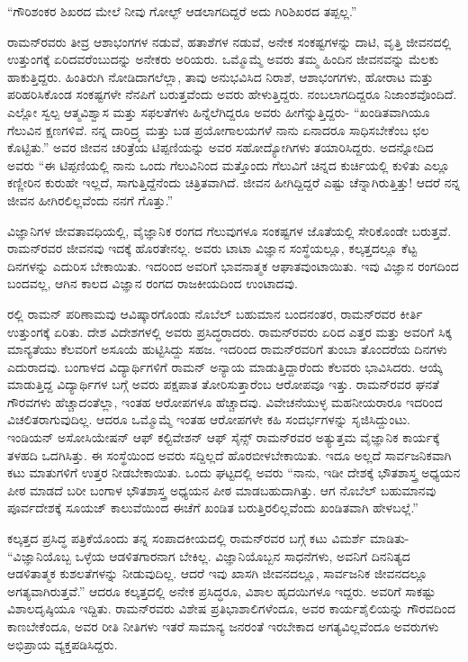“ಗೌರಿಶಂಕರ ಶಿಖರದ ಮೇಲೆ ನೀವು ಗೋಲ್ಫ್ ಆಡಲಾಗದಿದ್ದರೆ ಅದು ಗಿರಿಶಿಖರದ ತಪ್ಪಲ್ಲ.”

ರಾಮನ್‍ರವರು ತೀವ್ರ ಆಶಾಭಂಗಗಳ ನಡುವೆ, ಹತಾಶೆಗಳ ನಡುವೆ, ಅನೇಕ ಸಂಕಷ್ಟಗಳನ್ನು ದಾಟಿ, ವೃತ್ತಿ ಜೀವನದಲ್ಲಿ ಉತ್ತುಂಗಕ್ಕೆ ಏರಿದವರೆಂಬುದನ್ನು ಅನೇಕರು ಅರಿಯರು. ಒಮ್ಮೊಮ್ಮೆ ಅವರು ತಮ್ಮ ಹಿಂದಿನ ಜೀವನವನ್ನು ಮೆಲಕು ಹಾಕುತ್ತಿದ್ದರು. ಹಿಂತಿರುಗಿ ನೋಡಿದಾಗಲೆಲ್ಲಾ, ತಾವು ಅನುಭವಿಸಿದ ನಿರಾಶೆ, ಆಶಾಭಂಗಗಳು, ಹೋರಾಟ ಮತ್ತು ಪರಿಹರಿಸಿಕೊಂಡ ಸಂಕಷ್ಟಗಳೇ ನೆನಪಿಗೆ ಬರುತ್ತವೆಂದು ಅವರು ಹೇಳುತ್ತಿದ್ದರು. ನಂಬಲಾಗದಿದ್ದರೂ ನಿಜಾಂಶವೊಂದಿದೆ. ಎಲ್ಲೋ ಸ್ವಲ್ಪ ಆತ್ಮವಿಶ್ವಾಸ ಮತ್ತು ಸಫಲತೆಗಳು ಹಿನ್ನೆಲೆಗಿದ್ದರೂ ಅವರು ಹೀಗೆನ್ನುತ್ತಿದ್ದರು- “ಖಂಡಿತವಾಗಿಯೂ ಗೆಲುವಿನ ಕ್ಷಣಗಳಿವೆ. ನನ್ನ ದಾರಿದ್ರ್ಯ ಮತ್ತು ಬಡ ಪ್ರಯೋಗಾಲಯಗಳೆ ನಾನು ಏನಾದರೂ ಸಾಧಿಸಬೇಕೆಂಬ ಛಲ ಕೊಟ್ಟಿತು.” ಅವರ ಜೀವನ ಚರಿತ್ರೆಯ ಟಿಪ್ಪಣಿಯನ್ನು ಅವರ ಸಹೋದ್ಯೋಗಿಗಳು ತಯಾರಿಸಿದ್ದರು. ಅದನ್ನೋದಿದ ಅವರು “ಈ ಟಿಪ್ಪಣಿಯಲ್ಲಿ ನಾನು ಒಂದು ಗೆಲುವಿನಿಂದ ಮತ್ತೊಂದು ಗೆಲುವಿಗೆ ಚಿನ್ನದ ಕುರ್ಚಿಯಲ್ಲಿ ಕುಳಿತು ಎಲ್ಲೂ ಕಣ್ಣೀರಿನ ಕುರುಹೇ ಇಲ್ಲದೆ, ಸಾಗುತ್ತಿದ್ದೆನೆಂದು ಚಿತ್ರಿತವಾಗಿದೆ. ಜೀವನ ಹೀಗಿದ್ದಿದ್ದರೆ ಎಷ್ಟು ಚೆನ್ನಾಗಿರುತ್ತಿತ್ತು! ಆದರೆ ನನ್ನ ಜೀವನ ಹೀಗಿರಲಿಲ್ಲವೆಂದು ನನಗೆ ಗೊತ್ತು.”

ವಿಜ್ಞಾನಿಗಳ ಜೀವತಾವಧಿಯಲ್ಲಿ, ವೈಜ್ಞಾನಿಕ ರಂಗದ ಗೆಲುವುಗಳೂ ಸಂಕಷ್ಟಗಳ ಜೊತೆಯಲ್ಲಿ ಸೇರಿಕೊಂಡೇ ಬರುತ್ತವೆ. ರಾಮನ್‍ರವರ ಜೀವನವು ಇದಕ್ಕೆ ಹೊರತೇನಲ್ಲ. ಅವರು ಟಾಟಾ ವಿಜ್ಞಾನ ಸಂಸ್ಥೆಯಲ್ಲೂ, ಕಲ್ಕತ್ತದಲ್ಲೂ ಕೆಟ್ಟ ದಿನಗಳನ್ನು ಎದುರಿಸ ಬೇಕಾಯಿತು. ಇದರಿಂದ ಅವರಿಗೆ ಭಾವನಾತ್ಮಕ ಆಘಾತವುಂಟಾಯಿತು. ಇವು ವಿಜ್ಞಾನ ರಂಗದಿಂದ ಬಂದವಲ್ಲ, ಆಗಿನ ಕಾಲದ ವಿಜ್ಞಾನ ರಂಗದ ರಾಜಕೀಯದಿಂದ ಉಂಟಾದವು.

ರಲ್ಲಿ ರಾಮನ್ ಪರಿಣಾಮವು ಆವಿಷ್ಕಾರಗೊಂಡು ನೊಬೆಲ್ ಬಹುಮಾನ ಬಂದನಂತರ, ರಾಮನ್‍ರವರ ಕೀರ್ತಿ ಉತ್ತುಂಗಕ್ಕೆ ಏರಿತು. ದೇಶ ವಿದೇಶಗಳಲ್ಲಿ ಅವರು ಪ್ರಸಿದ್ಧರಾದರು. ರಾಮನ್‍ರವರು ಏರಿದ ಎತ್ತರ ಮತ್ತು ಅವರಿಗೆ ಸಿಕ್ಕ ಮಾನ್ಯತೆಯು ಕೆಲವರಿಗೆ ಅಸೂಯೆ ಹುಟ್ಟಿಸಿದ್ದು ಸಹಜ. ಇದರಿಂದ ರಾಮನ್‍ರವರಿಗೆ ತುಂಬಾ ತೊಂದರೆಯ ದಿನಗಳು ಎದುರಾದವು. ಬಂಗಾಳದ ವಿದ್ಯಾರ್ಥಿಗಳಿಗೆ ರಾಮನ್ ಅನ್ಯಾಯ ಮಾಡುತ್ತಿದ್ದಾರೆಂದು ಕೆಲವರು ಭಾವಿಸಿದರು. ಆಯ್ಕೆ ಮಾಡುತ್ತಿದ್ದ ವಿದ್ಯಾರ್ಥಿಗಳ ಬಗ್ಗೆ ಅವರು ಪಕ್ಷಪಾತ ತೋರಿಸುತ್ತಾರೆಂಬ ಆರೋಪವೂ ಇತ್ತು. ರಾಮನ್‍ರವರ ಘನತೆ ಗೌರವಗಳು ಹೆಚ್ಚಾದಂತೆಲ್ಲಾ, ಇಂತಹ ಆರೋಪಗಳೂ ಹೆಚ್ಚಾದವು. ವಿವೇಚನೆಯುಳ್ಳ ಮಹನೀಯರಾರೂ ಇದರಿಂದ ವಿಚಲಿತರಾಗುವುದಿಲ್ಲ. ಆದರೂ ಒಮ್ಮೊಮ್ಮೆ ಇಂತಹ ಆರೋಪಗಳೇ ಕಹಿ ಸಂದರ್ಭಗಳನ್ನು ಸೃಜಿಸಿದ್ದುಂಟು. ಇಂಡಿಯನ್ ಅಸೋಸಿಯೇಷನ್ ಆಫ್ ಕಲ್ಟಿವೇಶನ್ ಆಫ್ ಸೈನ್ಸ್ ರಾಮನ್‍ರವರ ಅತ್ಯುತ್ತಮ ವೈಜ್ಞಾನಿಕ ಕಾರ್ಯಕ್ಕೆ ತಳಹದಿ ಒದಗಿಸಿತ್ತು. ಈ ಸಂಸ್ಥೆಯಿಂದ ಅವರು ಸದ್ದಿಲ್ಲದೆ ಹೊರಬೀಳಬೇಕಾಯಿತು. ಇದೂ ಅಲ್ಲದೆ ಸಾರ್ವಜನಿಕವಾಗಿ ಕಟು ಮಾತುಗಳಿಗೆ ಉತ್ತರ ನೀಡಬೇಕಾಯಿತು. ಒಂದು ಘಟ್ಟದಲ್ಲಿ ಅವರು “ನಾನು, ಇಡೀ ದೇಶಕ್ಕೆ ಭೌತಶಾಸ್ತ್ರ ಅಧ್ಯಯನ ಪೀಠ ಮಾಡದೆ ಬರೀ ಬಂಗಾಳ ಭೌತಶಾಸ್ತ್ರ ಅಧ್ಯಯನ ಪೀಠ ಮಾಡಬಹುದಾಗಿತ್ತು. ಆಗ ನೊಬೆಲ್ ಬಹುಮಾನವು ಪೂರ್ವದೇಶಕ್ಕೆ ಸೂಯಜ್ ಕಾಲುವೆಯಿಂದ ಈಚೆಗೆ ಖಂಡಿತ ಬರುತ್ತಿರಲಿಲ್ಲವೆಂದು ಖಂಡಿತವಾಗಿ ಹೇಳಬಲ್ಲೆ.”

ಕಲ್ಕತ್ತದ ಪ್ರಸಿದ್ಧ ಪತ್ರಿಕೆಯೊಂದು ತನ್ನ ಸಂಪಾದಕೀಯದಲ್ಲಿ ರಾಮನ್‍ರವರ ಬಗ್ಗೆ ಕಟು ವಿಮರ್ಶೆ ಮಾಡಿತು- “ವಿಜ್ಞಾನಿಯೊಬ್ಬ ಒಳ್ಳೆಯ ಆಡಳಿತಗಾರನಾಗ ಬೇಕಿಲ್ಲ. ವಿಜ್ಞಾನಿಯೊಬ್ಬನ ಸಾಧನೆಗಳು, ಅವನಿಗೆ ದಿನನಿತ್ಯದ ಆಡಳಿತಾತ್ಮಕ ಕುಶಲತೆಗಳನ್ನು ನೀಡುವುದಿಲ್ಲ. ಆದರೆ ಇವು ಖಾಸಗಿ ಜೀವನದಲ್ಲೂ, ಸಾರ್ವಜನಿಕ ಜೀವನದಲ್ಲೂ ಅಗತ್ಯವಾಗಿರುತ್ತವೆ.” ಆದರೂ ಕಲ್ಕತ್ತದಲ್ಲಿ ಅನೇಕ ಪ್ರಸಿದ್ಧರೂ, ವಿಶಾಲ ಹೃದಯಿಗಳೂ ಇದ್ದರು. ಅವರಿಗೆ ಸಾಕಷ್ಟು ವಿಶಾಲದೃಷ್ಠಿಯೂ ಇದ್ದಿತು. ರಾಮನ್‍ರವರು ವಿಶೇಷ ಪ್ರತಿಭಾಶಾಲಿಗಳೆಂದೂ, ಅವರ ಕಾರ್ಯಶೈಲಿಯನ್ನು ಗೌರವದಿಂದ ಕಾಣಬೇಕೆಂದೂ, ಅವರ ರೀತಿ ನೀತಿಗಳು ಇತರೆ ಸಾಮಾನ್ಯ ಜನರಂತೆ ಇರಬೇಕಾದ ಅಗತ್ಯವಿಲ್ಲವೆಂದೂ ಅವರುಗಳು ಅಭಿಪ್ರಾಯ ವ್ಯಕ್ತಪಡಿಸಿದ್ದರು.

